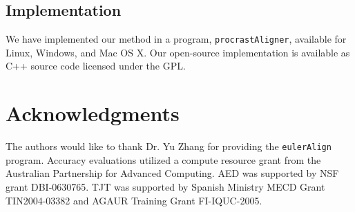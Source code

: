 \documentclass{ws-procs975x65}
\begin{document}
\subsection{Implementation}
We have implemented our method in a program, \texttt{procrastAligner}, available for Linux, Windows, and Mac OS X. Our open-source implementation is available as C++ source code licensed under the GPL.

\section{ Acknowledgments }
The authors would like to thank Dr. Yu Zhang for providing the \texttt{eulerAlign} program. 
Accuracy evaluations utilized a compute resource grant from the Australian Partnership for Advanced Computing.  AED was supported by NSF grant DBI-0630765. TJT was
supported by Spanish Ministry MECD Grant TIN2004-03382 and AGAUR
Training Grant FI-IQUC-2005.




\end{document}
